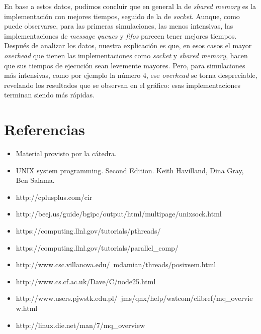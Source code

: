\documentclass[a4paper,10pt]{article}
\begin{document}
En base a estos datos, pudimos concluir que en general la de \textit{shared memory} es la implementación con mejores tiempos, seguido de la de \textit{socket}. Aunque,
como puede observarse, para las primeras simulaciones, las menos intensivas, las implementaciones de \textit{message queues} y \textit{fifos} parecen tener mejores
tiempos. Después de analizar los datos, nuestra explicación es que, en esos casos el mayor \textit{overhead} que tienen las implementaciones como \textit{socket} y 
\textit{shared memory}, hacen que sus tiempos de ejecución sean levemente mayores. Pero, para simulaciones más intensivas, como por ejemplo la número 4, ese
 \textit{overhead} se torna despreciable, revelando los resultados que se observan en el gráfico: esas implementaciones terminan siendo más rápidas.\\


\newpage     
\section{Referencias}

\begin{itemize}
  \item Material provisto por la cátedra.
  \item UNIX system programming. Second Edition. Keith Havilland, Dina Gray, Ben Salama.
  \item http://cplusplus.com/cir
  \item http://beej.us/guide/bgipc/output/html/multipage/unixsock.html
  \item https://computing.llnl.gov/tutorials/pthreads/
  \item https://computing.llnl.gov/tutorials/parallel\_comp/
  \item http://www.csc.villanova.edu/~mdamian/threads/posixsem.html
  \item http://www.cs.cf.ac.uk/Dave/C/node25.html
  \item http://www.users.pjwstk.edu.pl/~jms/qnx/help/watcom/clibref/mq\_overview.html
  \item http://linux.die.net/man/7/mq\_overview
\end{itemize}
   
\end{document}

